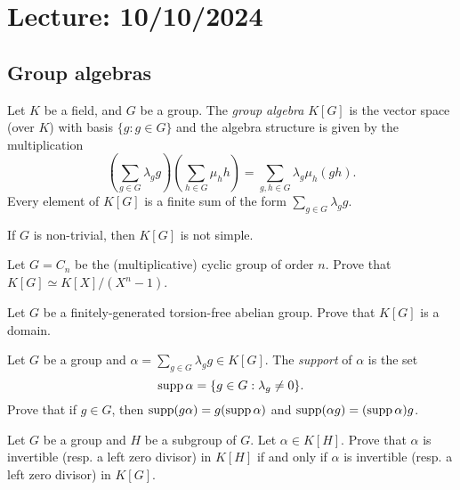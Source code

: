 \section{Lecture: 10/10/2024}
\label{03}

\subsection{Group algebras}

Let $K$ be a field, and $G$ be a group. The \emph{group algebra} $K[G]$ 
is the vector space (over $K$) with basis $\{g:g\in G\}$ 
and the algebra structure is given by the multiplication
\[
	\left(\sum_{g\in G}\lambda_gg\right)\left(\sum_{h\in G}\mu_hh\right)
	=\sum_{g,h\in G}\lambda_g\mu_h(gh).
\]
Every element of $K[G]$ is a finite sum of the form $\sum_{g\in G}\lambda_gg$.

\begin{exercise}
\label{xc:K[G]notsimple}
    If $G$ is non-trivial, then $K[G]$ is not simple. 
\end{exercise}

\begin{exercise}
\label{xca:K_cyclic}
	Let $G=C_n$ be the (multiplicative) cyclic group of order $n$. Prove that 
	$K[G]\simeq K[X]/(X^n-1)$. 
\end{exercise}

\begin{exercise}
\label{xca:abelian=>domain}
	Let $G$ be a finitely-generated torsion-free abelian group. Prove that 
	$K[G]$ is a domain. 
\end{exercise}



\begin{exercise}
	Let $G$ be a group and $\alpha=\sum_{g\in G}\lambda_gg\in K[G]$.  
	The \emph{support} of $\alpha$ is the set 
	\[
		\operatorname{supp}\alpha=\{g\in G:\lambda_g\ne 0\}.
	\]
	Prove that if $g\in G$, then 
	$\operatorname{supp}(g\alpha)=g(\operatorname{supp}\alpha)$ and $\operatorname{supp}(\alpha g)=(\operatorname{supp}\alpha)g$.
\end{exercise}

\begin{exercise}
\label{xca:invertible_subgroups}
	Let $G$ be a group and $H$ be a subgroup of $G$. Let $\alpha\in K[H]$. Prove that 
    $\alpha$ is invertible (resp. a left zero divisor) in $K[H]$ if and only if 
	$\alpha$ is invertible (resp. a left zero divisor) in
	$K[G]$.
\end{exercise}


